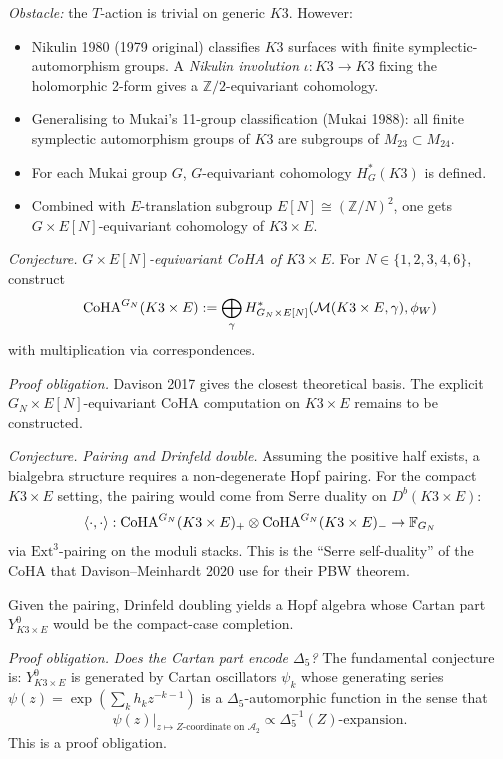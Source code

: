 \emph{Obstacle:} the $T$-action is trivial on generic $K3$. However:
\begin{itemize}
\item Nikulin 1980 (1979 original) classifies $K3$ surfaces with finite
symplectic-automorphism groups. A \emph{Nikulin involution} $\iota: K3 \to K3$ fixing
the holomorphic 2-form gives a $\mathbb{Z}/2$-equivariant cohomology.
\item Generalising to Mukai's 11-group classification (Mukai 1988): all finite
symplectic automorphism groups of $K3$ are subgroups of $M_{23} \subset M_{24}$.
\item For each Mukai group $G$, $G$-equivariant cohomology $H^*_G(K3)$ is defined.
\item Combined with $E$-translation subgroup $E[N] \cong (\mathbb{Z}/N)^2$, one gets
$G \times E[N]$-equivariant cohomology of $K3 \times E$.
\end{itemize}

\emph{Conjecture.} \emph{$G \times E[N]$-equivariant CoHA of $K3 \times E$.}
For $N \in \{1, 2, 3, 4, 6\}$, construct
\[
\mathrm{CoHA}^{G_N}(K3 \times E) := \bigoplus_\gamma H^*_{G_N \times E[N]}(\mathcal{M}(K3 \times E, \gamma), \phi_W)
\]
with multiplication via correspondences.

\emph{Proof obligation.} Davison 2017 gives the closest theoretical
basis. The explicit $G_N\times E[N]$-equivariant CoHA computation on
$K3\times E$ remains to be constructed.

\emph{Conjecture.} \emph{Pairing and Drinfeld double.}
Assuming the positive half exists, a bialgebra structure requires a non-degenerate
Hopf pairing. For the compact $K3 \times E$ setting, the pairing would come from
Serre duality on $D^b(K3 \times E)$:
\[
\langle \cdot, \cdot \rangle: \mathrm{CoHA}^{G_N}(K3 \times E)_+ \otimes \mathrm{CoHA}^{G_N}(K3 \times E)_- \to \mathbb{F}_{G_N}
\]
via $\mathrm{Ext}^3$-pairing on the moduli stacks. This is the ``Serre self-duality''
of the CoHA that Davison--Meinhardt 2020 use for their PBW theorem.

Given the pairing, Drinfeld doubling yields a Hopf algebra whose Cartan part
$Y^0_{K3 \times E}$ would be the compact-case completion.

\emph{Proof obligation.} \emph{Does the Cartan part encode $\Delta_5$?}
The fundamental conjecture is: $Y^0_{K3 \times E}$ is generated by Cartan oscillators
$\psi_k$ whose generating series $\psi(z) = \exp(\sum_k h_k z^{-k-1})$ is a
$\Delta_5$-automorphic function in the sense that
\[
\psi(z)\big|_{z \mapsto Z\text{-coordinate on } \mathcal{A}_2} \propto \Delta_5^{-1}(Z)\text{-expansion.}
\]
This is a proof obligation.

